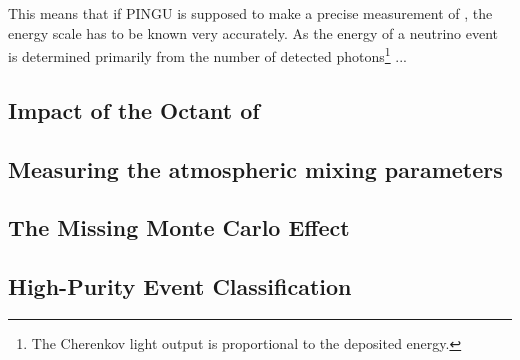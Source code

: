 This means that if PINGU is supposed to make a precise measurement of , 
the energy scale has to be known very accurately. As the energy of a neutrino 
event is determined primarily from the number of detected photons\footnote{The 
Cherenkov light output is proportional to the deposited energy.} ...

\subsection{Impact of the Octant of }
\label{sec:results_octant}

\subsection{Measuring the atmospheric mixing parameters}
\label{sec:results_atmosperic}

\subsection{The Missing Monte Carlo Effect}
\label{sec:results_mcstats}

\subsection{High-Purity Event Classification}
\label{sec:results_includeunkn}
